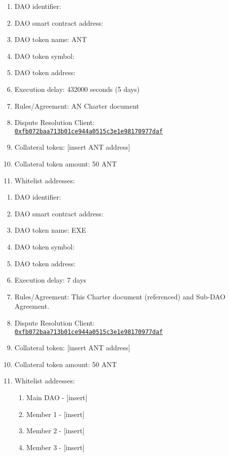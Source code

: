 
\label{chap:DAOParameters}

\begin{itemize}
	\begin{enumerate}[noitemsep]
		\item \ac{DAO} identifier:
		\item \ac{DAO} smart contract address:
		\item \ac{DAO} token name: \ac{ANT}
		\item \ac{DAO} token symbol:
		\item \ac{DAO} token address:
		\item Execution delay: 432000 seconds (5 days)
		\item Rules/Agreement: AN Charter document
		\item Dispute Resolution Client:\\ \href{https://etherscan.io/address/0xfb072baa713b01ce944a0515c3e1e98170977daf}{\texttt{0xfb072baa713b01ce944a0515c3e1e98170977daf}}
		\item Collateral token: [insert \ac{ANT} address]
		\item Collateral token amount: 50 \ac{ANT}
		\item Whitelist addresses:
	\end{enumerate}

	\begin{enumerate}[noitemsep]
		\item \ac{DAO} identifier:
		\item \ac{DAO} smart contract address:
		\item \ac{DAO} token name: EXE
		\item \ac{DAO} token symbol:
		\item \ac{DAO} token address:
		\item Execution delay: 7 days
		\item Rules/Agreement: This Charter document (referenced) and Sub-\ac{DAO} Agreement.
		\item Dispute Resolution Client:\\ \href{https://etherscan.io/address/0xfb072baa713b01ce944a0515c3e1e98170977daf}{\texttt{0xfb072baa713b01ce944a0515c3e1e98170977daf}}
		\item Collateral token: [insert \ac{ANT} address]
		\item Collateral token amount: 50 \ac{ANT}
		\item Whitelist addresses:
		\begin{enumerate}
			\item Main \ac{DAO} - [insert]
			\item Member 1 - [insert]
			\item Member 2 - [insert]
			\item Member 3 - [insert]
		\end{enumerate}
	\end{enumerate}


\end{itemize}

